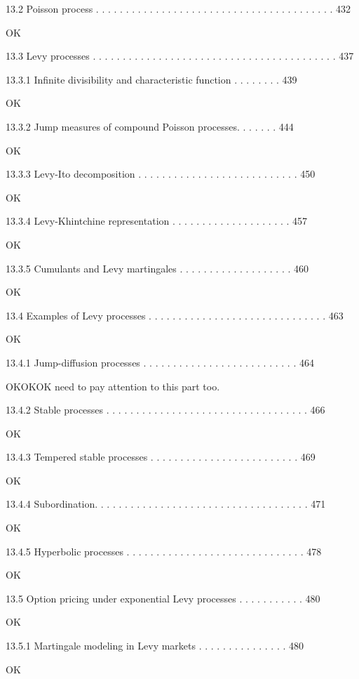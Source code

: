 13.2 Poisson process . . . . . . . . . . . . . . . . . . . . . . . . . . . . . . . . . . . . . . . . 432

OK

13.3 Levy processes . . . . . . . . . . . . . . . . . . . . . . . . . . . . . . . . . . . . . . . . . 437



13.3.1 Infinite divisibility and characteristic function . . . . . . . . 439

OK

13.3.2 Jump measures of compound Poisson processes. . . . . . . 444

OK

13.3.3 Levy-Ito decomposition . . . . . . . . . . . . . . . . . . . . . . . . . . . 450

OK

13.3.4 Levy-Khintchine representation . . . . . . . . . . . . . . . . . . . . 457

OK

13.3.5 Cumulants and Levy martingales . . . . . . . . . . . . . . . . . . . 460

OK

13.4 Examples of Levy processes . . . . . . . . . . . . . . . . . . . . . . . . . . . . . . 463

OK

13.4.1 Jump-diffusion processes . . . . . . . . . . . . . . . . . . . . . . . . . . 464

OKOKOK need to pay attention to this part too.

13.4.2 Stable processes . . . . . . . . . . . . . . . . . . . . . . . . . . . . . . . . . . 466

OK

13.4.3 Tempered stable processes . . . . . . . . . . . . . . . . . . . . . . . . . 469

OK

13.4.4 Subordination. . . . . . . . . . . . . . . . . . . . . . . . . . . . . . . . . . . . 471

OK

13.4.5 Hyperbolic processes . . . . . . . . . . . . . . . . . . . . . . . . . . . . . . 478

OK

13.5 Option pricing under exponential Levy processes . . . . . . . . . . . 480

OK

13.5.1 Martingale modeling in Levy markets . . . . . . . . . . . . . . . 480

OK

